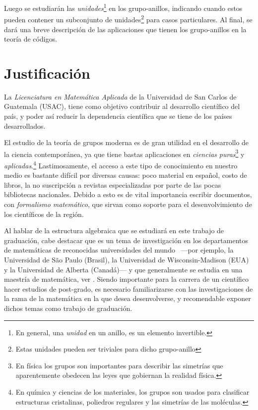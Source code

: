 \documentclass[12pt,letterpaper,titlepage]{article}
\begin{document}
Luego se estudiarán las \textit{unidades}\footnote{En general, una \textit{unidad} en un anillo, es un elemento invertible.} en los grupo-anillos, indicando cuando estos pueden contener un subconjunto de unidades\footnote{Estas unidades pueden ser triviales para dicho grupo-anillo} para casos particulares. Al final, se dará una breve descripción de las aplicaciones que tienen los grupo-anillos en la teoría de códigos.

\newpage

\section{Justificación}
La \textit{Licenciatura en Matemática Aplicada} de la \textsf{Universidad de San Carlos de Guatemala (USAC)}, tiene como objetivo contribuir al desarrollo científico del país, y poder así reducir la dependencia científica que se tiene de los países desarrollados. \bigskip

El estudio de la teoría de grupos moderna es de gran utilidad en el desarrollo de la ciencia contemporánea, ya que tiene bastas aplicaciones en \textit{ciencias puras}\footnote{En física los grupos son importantes para describir las simetrías que aparentemente obedecen las leyes que gobiernan la realidad física.} y \textit{aplicadas}.\footnote{En química y ciencias de los materiales, los grupos son usados para clasificar estructuras cristalinas, poliedros regulares y las simetrías de las moléculas.} Lastimosamente, el acceso a este tipo de conocimiento en nuestro medio es bastante difícil por diversas causas: poco material en español, costo de libros, la no suscripción a revistas especializadas por parte de las pocas bibliotecas nacionales. Debido a esto es de vital importancia escribir documentos, con \textit{formalismo matemático}, que sirvan como soporte para el desenvolvimiento de los científicos de la región. \bigskip

Al hablar de la estructura algebraica que se estudiará en este trabajo de graduación, cabe destacar que es un tema de investigación en los departamentos de matemáticas de reconocidas universidades del mundo ~---por ejemplo, la Universidad de São Paulo (Brasil), la Universidad de Wisconsin-Madison (EUA) y la Universidad de Alberta (Canadá)--- y que generalmente se estudia en una maestría de matemática, ver \cite{b1}. Siendo \textsf{importante} para la carrera de un científico hacer estudios de post-grado, es necesario familiarizarse con las investigaciones de la rama de la matemática en la que desea desenvolverse, y recomendable exponer dichos temas como trabajo de graduación. \bigskip
\end{document}
